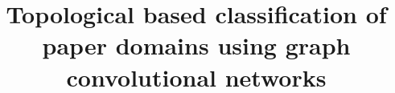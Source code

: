 \documentclass{article}
\title{Topological based classification of paper domains using graph convolutional networks}
\begin{document}
\maketitle
    







\pagebreak


\pagebreak

\end{document}
